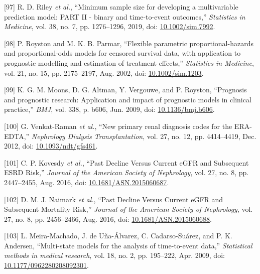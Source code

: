 \documentclass[12pt,PhD,twoside,openright]{muthesis}
\newenvironment{cslreferences}%
  {}%
  {\par}
\begin{document}
\begin{cslreferences}
\leavevmode\hypertarget{ref-riley_minimum_2019}{}%
{[}97{]} R. D. Riley \emph{et al.}, ``Minimum sample size for developing a multivariable prediction model: PART II - binary and time-to-event outcomes,'' \emph{Statistics in Medicine}, vol. 38, no. 7, pp. 1276--1296, 2019, doi: \href{https://doi.org/10.1002/sim.7992}{10.1002/sim.7992}.

\leavevmode\hypertarget{ref-royston_flexible_2002}{}%
{[}98{]} P. Royston and M. K. B. Parmar, ``Flexible parametric proportional-hazards and proportional-odds models for censored survival data, with application to prognostic modelling and estimation of treatment effects,'' \emph{Statistics in Medicine}, vol. 21, no. 15, pp. 2175--2197, Aug. 2002, doi: \href{https://doi.org/10.1002/sim.1203}{10.1002/sim.1203}.

\leavevmode\hypertarget{ref-moons_prognosis_2009-1}{}%
{[}99{]} K. G. M. Moons, D. G. Altman, Y. Vergouwe, and P. Royston, ``Prognosis and prognostic research: Application and impact of prognostic models in clinical practice,'' \emph{BMJ}, vol. 338, p. b606, Jun. 2009, doi: \href{https://doi.org/10.1136/bmj.b606}{10.1136/bmj.b606}.

\leavevmode\hypertarget{ref-venkat-raman_new_2012}{}%
{[}100{]} G. Venkat-Raman \emph{et al.}, ``New primary renal diagnosis codes for the ERA-EDTA,'' \emph{Nephrology Dialysis Transplantation}, vol. 27, no. 12, pp. 4414--4419, Dec. 2012, doi: \href{https://doi.org/10.1093/ndt/gfs461}{10.1093/ndt/gfs461}.

\leavevmode\hypertarget{ref-kovesdy_past_2016}{}%
{[}101{]} C. P. Kovesdy \emph{et al.}, ``Past Decline Versus Current eGFR and Subsequent ESRD Risk,'' \emph{Journal of the American Society of Nephrology}, vol. 27, no. 8, pp. 2447--2455, Aug. 2016, doi: \href{https://doi.org/10.1681/ASN.2015060687}{10.1681/ASN.2015060687}.

\leavevmode\hypertarget{ref-naimark_past_2016}{}%
{[}102{]} D. M. J. Naimark \emph{et al.}, ``Past Decline Versus Current eGFR and Subsequent Mortality Risk,'' \emph{Journal of the American Society of Nephrology}, vol. 27, no. 8, pp. 2456--2466, Aug. 2016, doi: \href{https://doi.org/10.1681/ASN.2015060688}{10.1681/ASN.2015060688}.

\leavevmode\hypertarget{ref-meira-machado_multi-state_2009}{}%
{[}103{]} L. Meira-Machado, J. de Uña-Álvarez, C. Cadarso-Suárez, and P. K. Andersen, ``Multi-state models for the analysis of time-to-event data,'' \emph{Statistical methods in medical research}, vol. 18, no. 2, pp. 195--222, Apr. 2009, doi: \href{https://doi.org/10.1177/0962280208092301}{10.1177/0962280208092301}.


\end{cslreferences}
\end{document}
